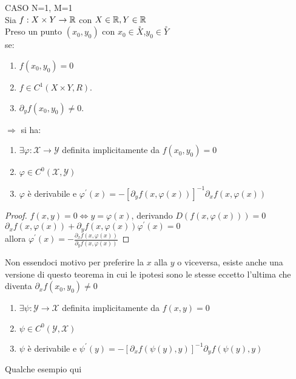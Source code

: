 \proposition CASO N=1, M=1\\
Sia $f:X\times Y\rightarrow \mathbb{R}$ con $X\in \mathbb{R}, Y\in \mathbb{R}$\\
Preso un punto $(x_0,y_0)$ con $x_0\in \overset{\circ}{X}$,$y_0\in \overset{\circ}{Y}$\\
se:
\begin{enumerate}
	\item $f(x_0,y_0)=0$
	\item $f\in C^1(X\times Y,R)$.
	\item $\partial_yf(x_0,y_0)\ne 0$.
\end{enumerate}
$\Rightarrow $ si ha:\\
\begin{enumerate}
	\item $\exists \varphi: \mathcal{X}\rightarrow\mathcal{Y}$ definita implicitamente da $f(x_0,y_0)=0$
	\item $\varphi\in C^0(\mathcal{X},\mathcal{Y})$
	\item $\varphi$ è derivabile e $\varphi^{'}(x)=-[\partial_yf(x,\varphi(x))]^{-1}\partial_xf(x,\varphi(x))$
\end{enumerate}
\begin{proof}
	$f(x,y)=0\Leftrightarrow y=\varphi(x)$, derivando $D(f(x,\varphi(x)))=0$\\
	$\partial_xf(x,\varphi(x))+\partial_yf(x,\varphi(x))\varphi^{'}(x)=0$\\
	allora $\varphi^{'}(x) = -\frac{\partial_xf(x,\varphi(x))}{\partial_yf(x,\varphi(x))}$
\end{proof}
\observation Non essendoci motivo per preferire la $x$ alla $y$ o viceversa, esiste anche una versione di questo teorema  in  cui le ipotesi sono le stesse eccetto l'ultima che diventa $\partial_xf(x_0,y_0)\ne 0$
\begin{enumerate}
	\item $\exists \psi: \mathcal{Y}\rightarrow\mathcal{X}$ definita implicitamente da $f(x,y)=0$
	\item $\psi\in C^0(\mathcal{Y},\mathcal{X})$
	\item $\psi$ è derivabile e $\psi^{'}(y)=-[\partial_xf(\psi(y),y)]^{-1}\partial_yf(\psi(y),y)$
\end{enumerate}
Qualche esempio qui\\
